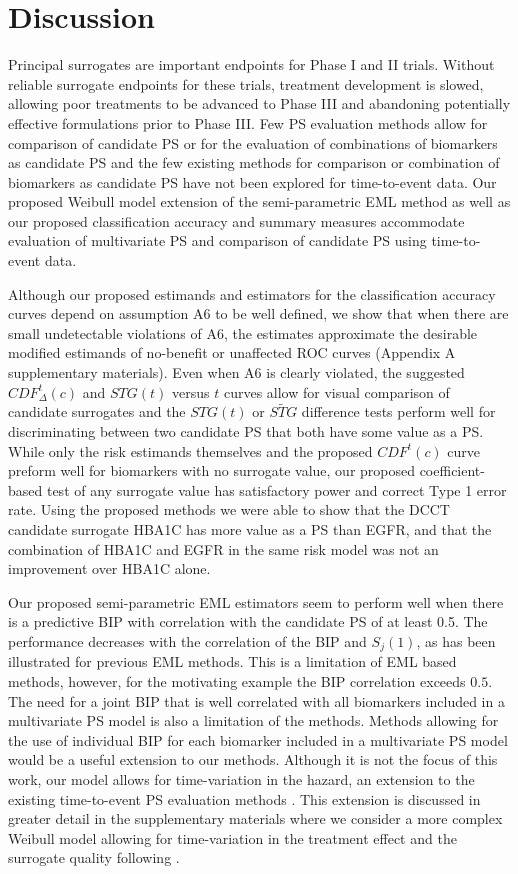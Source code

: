 \documentclass[times, doublespace]{simauth}
\begin{document}
\section{Discussion}
Principal surrogates are important endpoints for Phase I and II trials. Without reliable surrogate endpoints for these trials, treatment development is slowed, allowing poor treatments to be advanced to Phase III and abandoning potentially effective formulations prior to Phase III. Few PS evaluation methods allow for comparison of candidate PS or for the evaluation of combinations of biomarkers as candidate PS and the few existing methods for comparison or combination of biomarkers as candidate PS have not been explored for time-to-event data. Our proposed Weibull model extension of the \citet{Huang11} semi-parametric EML method as well as our proposed classification accuracy and summary measures accommodate evaluation of multivariate PS and comparison of candidate PS using time-to-event data. 

Although our proposed estimands and estimators for the classification accuracy curves depend on assumption A6 to be well defined, we show that when there are small undetectable violations of A6, the estimates approximate the desirable modified estimands of no-benefit or unaffected ROC curves (Appendix A supplementary materials). Even when A6 is clearly violated, the suggested $CDF^{t}_{\Delta}(c)$ and $STG(t)$ versus $t$ curves allow for visual comparison of candidate surrogates and the $STG(t)$ or $\widetilde{STG}$ difference tests perform well for discriminating between two candidate PS that both have some value as a PS. While only the risk estimands themselves and the proposed $CDF^{t}(c)$ curve preform well for biomarkers with no surrogate value, our proposed coefficient-based test of any surrogate value has satisfactory power and correct Type 1 error rate. Using the proposed methods we were able to show that the DCCT candidate surrogate HBA1C has more value as a PS than EGFR, and that the combination of HBA1C and EGFR in the same risk model was not an improvement over HBA1C alone.

Our proposed semi-parametric EML estimators seem to perform well when there is a predictive BIP with correlation with the candidate PS of at least 0.5. The performance decreases with the correlation of the BIP and $S_j(1)$, as has been illustrated for previous EML methods. This is a limitation of EML based methods, however, for the motivating example the BIP correlation exceeds $0.5$. The need for a joint BIP that is well correlated with all biomarkers included in a multivariate PS model is also a limitation of the methods. Methods allowing for the use of individual BIP for each biomarker included in a multivariate PS model would be a useful extension to our methods. Although it is not the focus of this work, our model allows for time-variation in the hazard, an extension to the existing time-to-event PS evaluation methods \citep{Qin07, Miao13}. This extension is discussed in greater detail in the supplementary materials where we consider a more complex Weibull model allowing for time-variation in the treatment effect and the surrogate quality following \citet{Gabriel13}.




%

\end{document}
